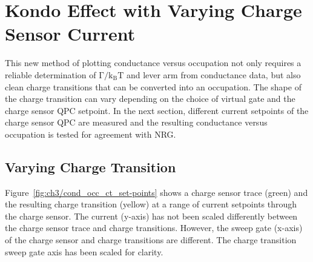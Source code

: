 \section{Kondo Effect with Varying Charge Sensor Current}

This new method of plotting conductance versus occupation not only requires a reliable determination of $\mathrm{\Gamma/k_BT}$ and lever arm from conductance data, but also clean charge transitions that can be converted into an occupation. The shape of the charge transition can vary depending on the choice of virtual gate and the charge sensor QPC setpoint. In the next section, different current setpoints of the charge sensor QPC are measured and the resulting conductance versus occupation is tested for agreement with NRG.


\subsection{Varying Charge Transition}




Figure~\ref{fig:ch3/cond_occ_ct_set-points} shows a charge sensor trace (green) and the resulting charge transition (yellow) at a range of current setpoints through the charge sensor. The current (y-axis) has not been scaled differently between the charge sensor trace and charge transitions. However, the sweep gate (x-axis) of the charge sensor and charge transitions are different. The charge transition sweep gate axis has been scaled for clarity. 



